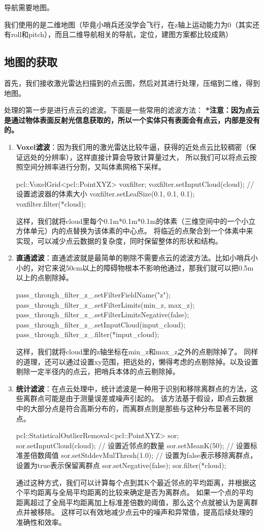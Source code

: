 导航需要地图。


我们使用的是二维地图（毕竟小哨兵还没学会飞行，在z轴上运动能力为0（其实还有roll和pitch），而且二维导航相关的导航，定位，建图方案都比较成熟）

\subsection{地图的获取}
首先，我们接收激光雷达扫描到的点云图，然后对其进行处理，压缩到二维，得到地图。

处理的第一步是进行点云的滤波。下面是一些常用的滤波方法：
\textbf{*注意：因为点云是通过物体表面反射光信息获取的，所以一个实体只有表面会有点云，内部是没有的。}
\begin{enumerate}
\item \textbf{Voxel滤波}：因为我们用的激光雷达比较牛逼，获得的近处点云比较稠密（保证远处的分辨率），这样直接计算会导致计算量过大，
所以我们可以将点云按照空间分辨率进行分割，又叫体素网格下采样。
\begin{tcode}
    pcl::VoxelGrid<pcl::PointXYZ> voxfilter;
    voxfilter.setInputCloud(cloud);
    // 设置滤波器的体素大小
    voxfilter.setLeafSize(0.1, 0.1, 0.1);
    voxfilter.filter(*cloud);
\end{tcode}
这样，我们就将cloud里每个0.1m*0.1m*0.1m的体素（三维空间中的一个小立方体单元）内的点替换为该体素的中心点。
将临近的点聚合到一个体素中来实现，可以减少点云数据的复杂度，同时保留整体的形状和结构。
\item \textbf{直通滤波}：直通滤波就是最简单的剔除不需要点云的滤波方法。比如小哨兵小小的，对它来说50cm以上的障碍物根本不影响他通过，那我们就可以把0.5m以上的点剔除掉。
\begin{tcode}
    pass_through_filter_z_.setFilterFieldName("z");
    pass_through_filter_z_.setFilterLimits(min_z, max_z);
    pass_through_filter_z_.setFilterLimitsNegative(false);
    pass_through_filter_z_.setInputCloud(input_cloud);
    pass_through_filter_z_.filter(*input_cloud);
\end{tcode}
这样，我们就将cloud里的z轴坐标在min\_z和max\_z之外的点剔除掉了。
同样的道理，还可以通过设置xy范围，把远处的，懒得考虑的点剔除掉。以及设置剔除一定半径内的点云，把哨兵本体的点云剔除掉。
\item \textbf{统计滤波}：在点云处理中，统计滤波是一种用于识别和移除离群点的方法，这些离群点可能是由于测量误差或噪声引起的。
该方法基于假设，即点云数据中的大部分点是符合高斯分布的，而离群点则是那些与这种分布显著不同的点。
\begin{tcode}
    pcl::StatisticalOutlierRemoval<pcl::PointXYZ> sor;
    sor.setInputCloud(cloud);
    // 设置近邻点的数量
    sor.setMeanK(50); 
    // 设置标准差倍数阈值
    sor.setStddevMulThresh(1.0); 
    // 设置为false表示移除离群点，设置为true表示保留离群点
    sor.setNegative(false); 
    sor.filter(*cloud);
\end{tcode}
通过这种方式，我们可以计算每个点到其K个最近邻点的平均距离，并根据这个平均距离与全局平均距离的比较来确定是否为离群点。
如果一个点的平均距离超过了全局平均距离加上标准差倍数的阈值，那么这个点就被认为是离群点并被移除。
这样可以有效地减少点云中的噪声和异常值，提高后续处理的准确性和效率。


\end{enumerate}
